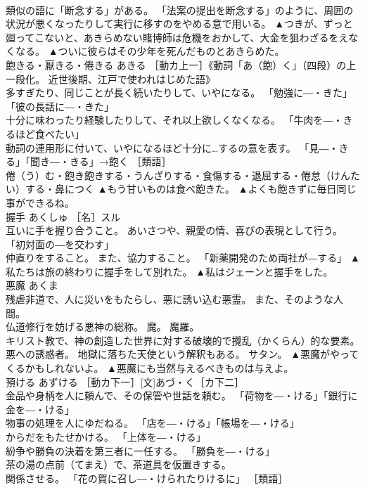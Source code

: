 \documentclass[8pt]{extreport}
\begin{document}
\begin{CJK}{UTF8}{min}
\\	類似の語に「断念する」がある。 「法案の提出を断念する」のように、周囲の状況が悪くなったりして実行に移すのをやめる意で用いる。	▲つきが、ずっと廻ってこないと、あきらめない賭博師は危機をおかして、大金を狙わざるをえなくなる。 ▲ついに彼らはその少年を死んだものとあきらめた。
\\	飽きる・厭きる・倦きる	あきる	［動カ上一］《動詞「あ（飽）く」（四段）の上一段化。 近世後期、江戸で使われはじめた語》 
\\	多すぎたり、同じことが長く続いたりして、いやになる。 「勉強に―・きた」「彼の長話に―・きた」 
\\	十分に味わったり経験したりして、それ以上欲しくなくなる。 「牛肉を―・きるほど食べたい」 
\\	動詞の連用形に付いて、いやになるほど十分に…するの意を表す。 「見―・きる」「聞き―・きる」→飽く ［類語］
\\	倦（う）む・飽き飽きする・うんざりする・食傷する・退屈する・倦怠（けんたい）する・鼻につく	▲もう甘いものは食べ飽きた。 ▲よくも飽きずに毎日同じ事ができるね。
\\	握手	あくしゅ	［名］スル 
\\	互いに手を握り合うこと。 あいさつや、親愛の情、喜びの表現として行う。 「初対面の―を交わす」 
\\	仲直りをすること。 また、協力すること。 「新薬開発のため両社が―する」	▲私たちは旅の終わりに握手をして別れた。 ▲私はジェーンと握手をした。
\\	悪魔	あくま	
\\	残虐非道で、人に災いをもたらし、悪に誘い込む悪霊。 また、そのような人間。 
\\	仏道修行を妨げる悪神の総称。 魔。 魔羅。 
\\	キリスト教で、神の創造した世界に対する破壊的で攪乱（かくらん）的な要素。 悪への誘惑者。 地獄に落ちた天使という解釈もある。 サタン。	▲悪魔がやってくるかもしれないよ。 ▲悪魔にも当然与えるべきものは与えよ。
\\	預ける	あずける	［動カ下一］[文]あづ・く［カ下二］ 
\\	金品や身柄を人に頼んで、その保管や世話を頼む。 「荷物を―・ける」「銀行に金を―・ける」 
\\	物事の処理を人にゆだねる。 「店を―・ける」「帳場を―・ける」 
\\	からだをもたせかける。 「上体を―・ける」 
\\	紛争や勝負の決着を第三者に一任する。 「勝負を―・ける」 
\\	茶の湯の点前（てまえ）で、茶道具を仮置きする。 
\\	関係させる。 「花の賀に召し―・けられたりけるに」 ［類語］

\end{CJK}
\end{document}
